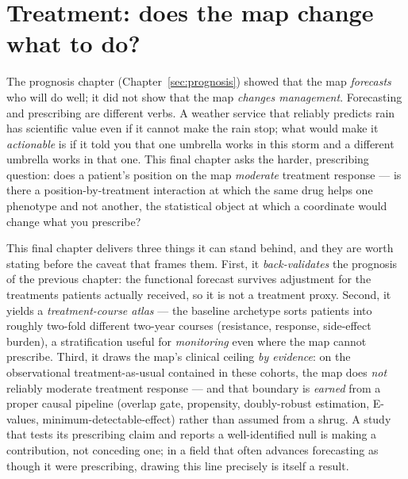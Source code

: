 \section{Treatment: does the map change what to do?}
\label{sec:treatment}

The prognosis chapter (Chapter~\ref{sec:prognosis}) showed that the map \emph{forecasts} who will do well; it
did not show that the map \emph{changes management}. Forecasting and prescribing are different verbs. A weather
service that reliably predicts rain has scientific value even if it cannot make the rain stop; what would make it
\emph{actionable} is if it told you that one umbrella works in this storm and a different umbrella works in that
one. This final chapter asks the harder, prescribing question: does a patient's position on the map
\emph{moderate} treatment response --- is there a position-by-treatment interaction at which the same drug helps
one phenotype and not another, the statistical object at which a coordinate would change what you prescribe?

This final chapter delivers three things it can stand behind, and they are worth stating before the caveat that
frames them. First, it \emph{back-validates} the prognosis of the previous chapter: the functional forecast
survives adjustment for the treatments patients actually received, so it is not a treatment proxy. Second, it
yields a \emph{treatment-course atlas} --- the baseline archetype sorts patients into roughly two-fold
different two-year courses (resistance, response, side-effect burden), a stratification useful for
\emph{monitoring} even where the map cannot prescribe. Third, it draws the map's clinical ceiling \emph{by
evidence}: on the observational treatment-as-usual contained in these cohorts, the map does \emph{not} reliably
moderate treatment response --- and that boundary is \emph{earned} from a proper causal pipeline (overlap gate,
propensity, doubly-robust estimation, E-values, minimum-detectable-effect) rather than assumed from a shrug. A
study that tests its prescribing claim and reports a well-identified null is making a contribution, not
conceding one; in a field that often advances forecasting as though it were prescribing, drawing this line
precisely is itself a result.


